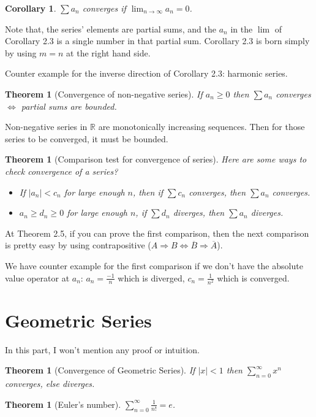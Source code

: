 \documentclass[12pt]{article}
\newcommand{\RR}{\mathbb{R}}   %
\newcommand{\abs}[1]{\left|#1\right|}
\theoremstyle{definition}
\theoremstyle{plain}
\newtheorem{theorem}[definition]{Theorem}
\newtheorem{corollary}[definition]{Corollary}
\begin{document}
\begin{corollary}
$\sum a_n$ converges if $\lim_{n\rightarrow\infty}a_n = 0$.
\end{corollary}

\begin{note}
Note that, the series' elements are partial sums, and the $a_n$ in the $\lim$ of Corollary 2.3 is a single number in that partial sum. Corollary 2.3 is born simply by using $m=n$ at the right hand side.

Counter example for the inverse direction of Corollary 2.3: harmonic series.
\end{note}

\begin{theorem}[Convergence of non-negative series]
If $a_n \ge 0$ then $\sum a_n$ converges $\iff$ partial sums are bounded.
\end{theorem}

\begin{note}
Non-negative series in $\RR$ are monotonically increasing sequences. Then for those series to be converged, it must be bounded.
\end{note}

\begin{theorem}[Comparison test for convergence of series]
Here are some ways to check convergence of a series?
\begin{itemize}
    \item If $\abs{a_n}<c_n$ for large enough $n$, then if $\sum c_n$ converges, then $\sum a_n$ converges.
    \item $a_n\ge d_n\ge 0$ for large enough $n$, if $\sum d_n$ diverges, then $\sum a_n$ diverges.
\end{itemize}
\end{theorem}

\begin{note}
At Theorem 2.5, if you can prove the first comparison, then the next comparison is pretty easy by using contrapositive ($A \Rightarrow B \iff \overline{B} \Rightarrow \overline{A}$).

We have counter example for the first comparison if we don't have the absolute value operator at $a_n$: $a_n = \frac{-1}{n}$ which is diverged, $c_n = \frac{1}{n^2}$ which is converged.
\end{note}

\section{Geometric Series}
\begin{note}
In this part, I won't mention any proof or intuition.
\end{note}

\begin{theorem}[Convergence of Geometric Series]
If $\abs{x}<1$ then $\sum_{n=0}^{\infty}x^n$ converges, else diverges.
\end{theorem}

\begin{theorem}[Euler's number]
$\sum_{n=0}^{\infty}\frac{1}{n!}=e$.
\end{theorem}
\end{document}
